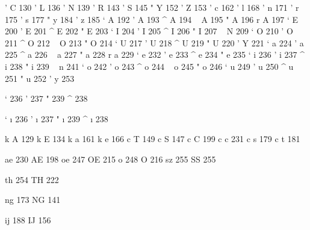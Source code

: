  ' C 130
 ' L 136
 ' N 139
 ' R 143
 ' S 145
 " Y 152
 ' Z 153
 ' c 162
 ' l 168
 ' n 171
 ' r 175
 ' s 177
 " y 184
 ' z 185
 ` A 192
 ' A 193
 ^ A 194
 ~ A 195
 " A 196
 r A 197
 ` E 200
 ' E 201
 ^ E 202
 " E 203
 ` I 204
 ' I 205
 ^ I 206
 " I 207
 ~ N 209
 ` O 210
 ' O 211
 ^ O 212
 ~ O 213
 " O 214
 ` U 217
 ' U 218
 ^ U 219
 " U 220
 ' Y 221
 ` a 224
 ' a 225
 ^ a 226
 ~ a 227
 " a 228
 r a 229
 ` e 232
 ' e 233
 ^ e 234
 " e 235
 ` i 236
 ' i 237
 ^ i 238
 " i 239
 ~ n 241
 ` o 242
 ' o 243
 ^ o 244
 ~ o 245
 " o 246
 ` u 249
 ' u 250
 ^ u 251
 " u 252
 ' y 253

 ` {\dotlessi} 236
 ' {\dotlessi} 237
 " {\dotlessi} 239
 ^ {\dotlessi} 238

 ` {\i} 236
 ' {\i} 237
 " {\i} 239
 ^ {\i} 238


 k A 129
 k E 134
 k a 161
 k e 166
 c T 149
 c S 147
 c C 199
 c c 231
 c s 179
 c t 181

 ae 230
 AE 198
 oe 247
 OE 215
 o  248
 O  216
 sz 255  %
 SS 255  %

 th 254
 TH 222

 ng 173
 NG 141

 ij 188
 IJ 156

